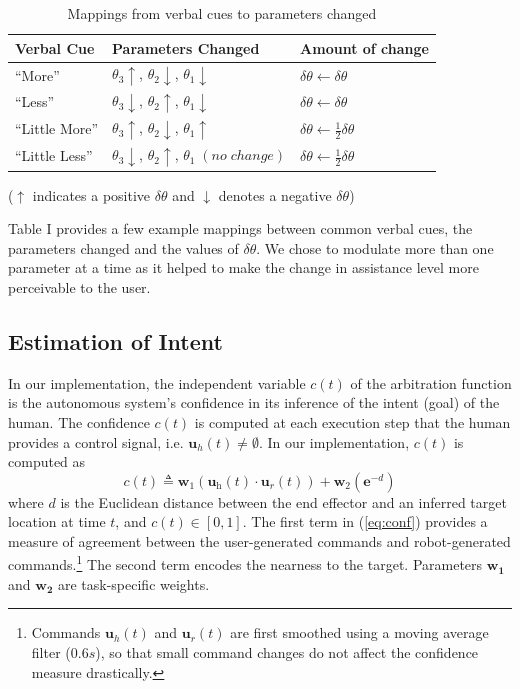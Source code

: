 \documentclass[letterpaper, 10 pt, journal, twoside]{IEEEtran}  %
\begin{document}
	\begin{table}[t]
		\centering
		\begin{tabular}{|l|l|l|}
			\hline
			{Verbal Cue} & {Parameters Changed} & {Amount of change}\\
			\hline
			``More'' & $\theta_{3}\uparrow$, $\theta_{2}\downarrow$, $\theta_{1}\downarrow$ & $\delta\theta \leftarrow \delta\theta$
			\\ \hline
			``Less'' & $\theta_{3}\downarrow$, $\theta_{2}\uparrow$, $\theta_{1}\downarrow$ &  $\delta\theta \leftarrow \delta\theta$ \\ \hline
			``Little More'' & $\theta_{3}\uparrow$, $\theta_{2}\downarrow$, $\theta_{1}\uparrow$ & $\delta\theta \leftarrow \frac{1}{2} \delta\theta$ \\ [5pt] 	 \hline
			``Little Less'' & $\theta_{3}\downarrow$, $\theta_{2}\uparrow$, $\theta_{1}\;(no\;change)$  & $\delta\theta \leftarrow \frac{1}{2} \delta\theta$ \\  \hline
		\end{tabular}
		\label{tbl:maptable}
		\vspace{.2cm}
		\caption{Mappings from verbal cues to parameters changed}
		\vspace{-.4cm}
		($\uparrow$ indicates a positive $\delta\theta$ and $\downarrow$ denotes a negative $\delta\theta$)
		\vspace{-0.2cm}
	\end{table}
	Table I provides a few example mappings between common
	verbal cues, the parameters changed and the values of $\delta\theta$. We chose to modulate more than one parameter at a time as it helped to make the change in assistance level more perceivable to the user.
	
	\subsection{Estimation of Intent} \label{ECV} 
	In our implementation, the independent variable $c(t)$ of the arbitration function is the autonomous system's confidence in its inference of the intent (goal) of the human. The confidence $c(t)$ is computed at each execution step
	that the human provides a control signal, i.e. $\boldsymbol{u}_{h}(t) \ne
	\emptyset$.
	In our implementation, $c(t)$ is computed as
	\begin{equation}
	c(t) \triangleq \boldsymbol{w}_{1}(\boldsymbol{u}_\textit{h}(t) \cdot \boldsymbol{u}_\textit{r}(t)) + \boldsymbol{w}_{2}(\boldsymbol{e}^{-d})
	\label{eq:conf}
	\end{equation}
	where $d$ is the Euclidean distance between the end effector and an
	inferred target location at time $t$, and $c(t) \in [0,1]$.
	The first term in (\ref{eq:conf}) 
	provides a measure of
	agreement between the user-generated commands and robot-generated commands.\footnote{Commands $\boldsymbol{u}_{h}(t)$ and $\boldsymbol{u}_{r}(t)$ are first smoothed using a moving average filter ($0.6s$), so that small command changes do not affect the confidence measure drastically.}
	The second term encodes the nearness to the target.
	Parameters $\boldsymbol{w_{1}}$ and $\boldsymbol{w_{2}}$ are
	task-specific weights.
	
\end{document}
